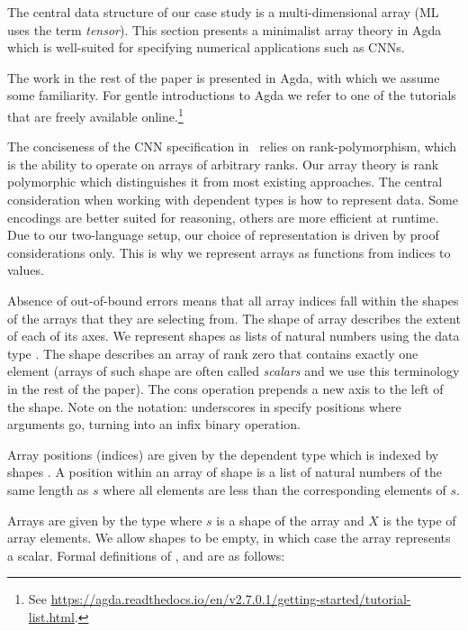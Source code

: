 The central data structure of our case study is a multi-dimensional array (ML
uses the term \emph{tensor}).  This section presents a minimalist array theory in Agda
which is well-suited for specifying numerical applications such as CNNs.

The work in the rest of the paper is presented in Agda, with which we assume some
familiarity.
For gentle introductions to Agda we refer to one of the tutorials that are freely available
online.\footnote{See \url{https://agda.readthedocs.io/en/v2.7.0.1/getting-started/tutorial-list.html}.}

The conciseness of the CNN specification
in~\cite{cnn-array} relies on rank-polymorphism, which is the ability to operate
on arrays of arbitrary ranks.  Our array theory is rank polymorphic
which distinguishes it from most existing approaches.
The central consideration when working with dependent types is how to represent data.
Some encodings are better suited for reasoning, others are more efficient
at runtime.  Due to our two-language setup, our choice of representation is
driven by proof considerations only.
This is why we represent arrays as functions from indices to values.

Absence of out-of-bound errors means that all array indices fall within
the shapes of the arrays that they are selecting from.
The shape of array describes the extent of each of its axes.  We represent
shapes as lists of natural numbers using the data type .
The \AC{[]} shape describes an array of rank zero that contains exactly one
element (arrays of such shape are often called \emph{scalars} and we use this
terminology in the rest of the paper).
The cons operation  prepends a new axis to the left of the shape.
Note on the notation: underscores in  specify positions where
arguments go, turning  into an infix binary operation.

Array positions (indices) are given by the dependent type  which
is indexed by shapes .  A position within an array of shape 
is a list of natural numbers of the same length as $s$ where all elements
are less than the corresponding elements of $s$.

Arrays are given by the type    where $s$ is a shape of the
array and $X$ is the type of array elements. We allow shapes to be empty, in
which case the array represents a scalar. Formal definitions of , 
and  are as follows:

